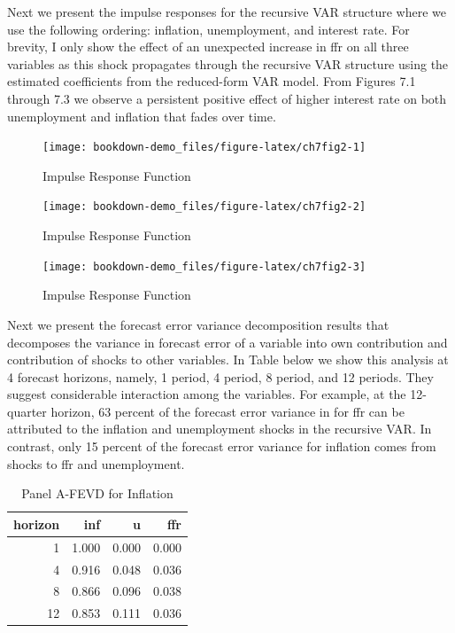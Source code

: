 \documentclass[]{book}
\theoremstyle{definition}
\theoremstyle{definition}
\theoremstyle{definition}
\theoremstyle{remark}
\begin{document}
Next we present the impulse responses for the recursive VAR structure where we use the following ordering: inflation, unemployment, and interest rate. For brevity, I only show the effect of an unexpected increase in ffr on all three variables as this shock propagates through the recursive VAR structure using the estimated coefficients from the reduced-form VAR model. From Figures 7.1 through 7.3 we observe a persistent positive effect of higher interest rate on both unemployment and inflation that fades over time.

\begin{figure}

{\centering \texttt{[image: bookdown-demo\_files/figure-latex/ch7fig2-1]} 

}

\caption{Impulse Response Function }\label{fig:ch7fig21}
\end{figure}\begin{figure}

{\centering \texttt{[image: bookdown-demo\_files/figure-latex/ch7fig2-2]} 

}

\caption{Impulse Response Function }\label{fig:ch7fig22}
\end{figure}\begin{figure}

{\centering \texttt{[image: bookdown-demo\_files/figure-latex/ch7fig2-3]} 

}

\caption{Impulse Response Function }\label{fig:ch7fig23}
\end{figure}

Next we present the forecast error variance decomposition results that decomposes the variance in forecast error of a variable into own contribution and contribution of shocks to other variables. In Table below we show this analysis at 4 forecast horizons, namely, 1 period, 4 period, 8 period, and 12 periods.
They suggest considerable interaction among the variables. For example, at the 12-quarter
horizon, 63 percent of the forecast error variance in for ffr can be attributed to the inflation and unemployment shocks in the recursive VAR. In contrast, only 15 percent of the forecast error variance for inflation comes from shocks to ffr and unemployment.

\begin{table}[t]

\caption{\label{tab:unnamed-chunk-13} Panel A-FEVD for Inflation}
\centering
\begin{tabular}{r|r|r|r}
\hline
horizon & inf & u & ffr\\
\hline
1 & 1.000 & 0.000 & 0.000\\
\hline
4 & 0.916 & 0.048 & 0.036\\
\hline
8 & 0.866 & 0.096 & 0.038\\
\hline
12 & 0.853 & 0.111 & 0.036\\
\hline
\end{tabular}
\end{table}
\end{document}
